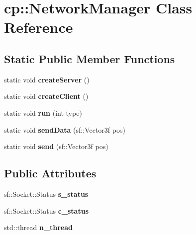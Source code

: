 \hypertarget{classcp_1_1_network_manager}{}\section{cp\+:\+:Network\+Manager Class Reference}
\label{classcp_1_1_network_manager}
\subsection*{Static Public Member Functions}
\begin{DoxyCompactItemize}
\item 
\mbox{\label{classcp_1_1_network_manager_ab8f3c5d78ac3b03baba90b912c5fe8d6}} 
static void {\bfseries create\+Server} ()
\item 
\mbox{\label{classcp_1_1_network_manager_aa0eb43e50d562372c9d4d14a96b76346}} 
static void {\bfseries create\+Client} ()
\item 
\mbox{\label{classcp_1_1_network_manager_aec8af90063036824008ffd0390a59844}} 
static void {\bfseries run} (int type)
\item 
\mbox{\label{classcp_1_1_network_manager_a207bc3b12643d96cd779b3c084c5a2cc}} 
static void {\bfseries send\+Data} (sf\+::\+Vector3f pos)
\item 
\mbox{\label{classcp_1_1_network_manager_af92420957986df43d458355b3e0ecd0a}} 
static void {\bfseries send} (sf\+::\+Vector3f pos)
\end{DoxyCompactItemize}
\subsection*{Public Attributes}
\begin{DoxyCompactItemize}
\item 
\mbox{\label{classcp_1_1_network_manager_a31a23545e4ed63151981fcfdd464f0ed}} 
sf\+::\+Socket\+::\+Status {\bfseries s\+\_\+status}
\item 
\mbox{\label{classcp_1_1_network_manager_ad234304dd0a7921c4911c845ebddbe15}} 
sf\+::\+Socket\+::\+Status {\bfseries c\+\_\+status}
\item 
\mbox{\label{classcp_1_1_network_manager_a18ca26aa75e4e020d3dabca634bb48eb}} 
std\+::thread {\bfseries n\+\_\+thread}
\end{DoxyCompactItemize}
